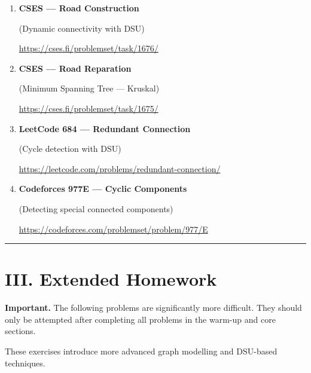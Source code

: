 \documentclass[11pt]{article}
\begin{document}
\begin{enumerate}

\item \textbf{CSES — Road Construction}

(Dynamic connectivity with DSU)

\vspace{0.3em}
{\url{https://cses.fi/problemset/task/1676/}}

\vspace{0.8em}

\item \textbf{CSES — Road Reparation}

(Minimum Spanning Tree — Kruskal)

\vspace{0.3em}
{\url{https://cses.fi/problemset/task/1675/}}

\vspace{0.8em}

\item \textbf{LeetCode 684 — Redundant Connection}

(Cycle detection with DSU)

\vspace{0.3em}
{\url{https://leetcode.com/problems/redundant-connection/}}

\vspace{0.8em}

\item \textbf{Codeforces 977E — Cyclic Components}

(Detecting special connected components)

\vspace{0.3em}
{\url{https://codeforces.com/problemset/problem/977/E}}

\end{enumerate}

\vspace{1em}
\hrule
\vspace{1em}

\section*{III. Extended Homework}

\textbf{Important.} The following problems are significantly more difficult.  
They should only be attempted after completing all problems in the warm-up and core sections.

These exercises introduce more advanced graph modelling and DSU-based techniques.
\end{document}
